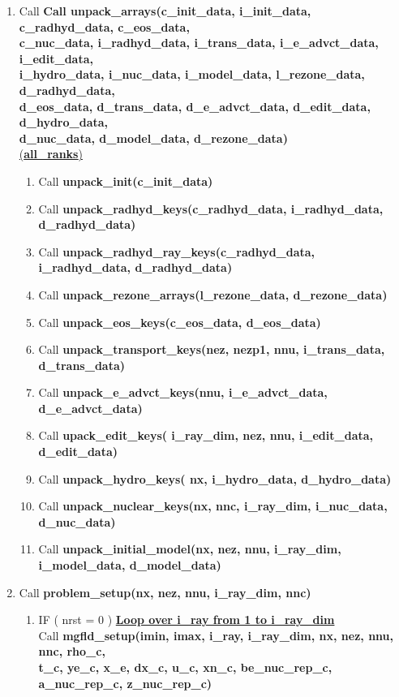 \documentclass[11pt,doublespace]{article}
\begin{document}
\begin{itemize}
\begin{enumerate}
\begin{enumerate}
  \item Call {\bf Call unpack\_arrays(c\_init\_data, i\_init\_data, c\_radhyd\_data, c\_eos\_data,\\ c\_nuc\_data, i\_radhyd\_data, i\_trans\_data, i\_e\_advct\_data, i\_edit\_data, \\
i\_hydro\_data, i\_nuc\_data, i\_model\_data, l\_rezone\_data, d\_radhyd\_data, \\
d\_eos\_data, d\_trans\_data, d\_e\_advct\_data, d\_edit\_data, d\_hydro\_data, \\
d\_nuc\_data, d\_model\_data, d\_rezone\_data)}\\
 \underline{({\bf all\_ranks})}
\begin{enumerate}
  \item Call {\bf unpack\_init(c\_init\_data)}
  \item Call {\bf unpack\_radhyd\_keys(c\_radhyd\_data, i\_radhyd\_data, d\_radhyd\_data)}
  \item Call {\bf unpack\_radhyd\_ray\_keys(c\_radhyd\_data, i\_radhyd\_data, d\_radhyd\_data)}
  \item Call {\bf unpack\_rezone\_arrays(l\_rezone\_data, d\_rezone\_data)}
  \item Call {\bf unpack\_eos\_keys(c\_eos\_data, d\_eos\_data)}
  \item Call {\bf unpack\_transport\_keys(nez, nezp1, nnu, i\_trans\_data, d\_trans\_data)}
  \item Call {\bf unpack\_e\_advct\_keys(nnu, i\_e\_advct\_data, d\_e\_advct\_data)}
  \item Call {\bf upack\_edit\_keys( i\_ray\_dim, nez, nnu, i\_edit\_data, d\_edit\_data)}
  \item Call {\bf unpack\_hydro\_keys( nx, i\_hydro\_data, d\_hydro\_data)}
  \item Call {\bf unpack\_nuclear\_keys(nx, nnc, i\_ray\_dim, i\_nuc\_data, d\_nuc\_data)}
  \item Call {\bf unpack\_initial\_model(nx, nez, nnu, i\_ray\_dim, i\_model\_data, d\_model\_data)}
\end{enumerate}
  \item Call {\bf problem\_setup(nx, nez, nnu, i\_ray\_dim, nnc)}
\begin{enumerate}
  \item IF ( nrst = 0 ) {\bf {\underline{Loop over i\_ray from 1 to i\_ray\_dim}}}\\
   Call {\bf mgfld\_setup(imin, imax, i\_ray, i\_ray\_dim, nx, nez, nnu, nnc, rho\_c, \\
   t\_c, ye\_c, x\_e, dx\_c, u\_c, xn\_c, be\_nuc\_rep\_c, a\_nuc\_rep\_c, z\_nuc\_rep\_c)}\\

\end{enumerate}
\end{enumerate}
\end{enumerate}
\end{itemize}
\end{document}
